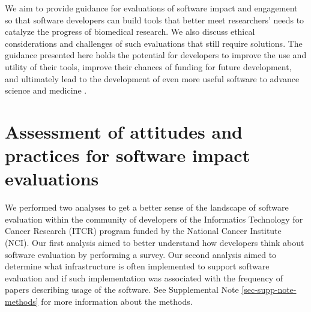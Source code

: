 \documentclass{article}
\begin{document}
We aim to provide guidance for evaluations of software impact and engagement so that software developers can build tools that better meet researchers' needs to catalyze the progress of biomedical research. We also discuss ethical considerations and challenges of such evaluations that still require solutions. The guidance presented here holds the potential for developers to improve the use and utility of their tools, improve their chances of funding for future development, and ultimately lead to the development of even more useful software to advance science and medicine \cite{wratten_reproducible_2021}. 



\section{Assessment of attitudes and practices for software impact evaluations}

We performed two analyses to get a better sense of the landscape of software evaluation within the community of developers of the Informatics Technology for Cancer Research (ITCR) program funded by the National Cancer Institute (NCI). Our first analysis aimed to better understand how developers think about software evaluation by performing a survey. Our second analysis aimed to determine what infrastructure is often implemented to support software evaluation and if such implementation was associated with the frequency of papers describing usage of the software. See Supplemental Note \ref{sec-supp-note-methods} for more information about the methods. 
\end{document}
